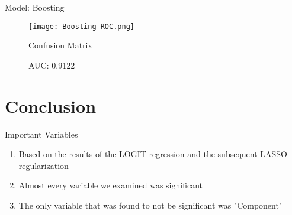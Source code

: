 \documentclass[notes,compress,serif,professionalfont]{beamer}
\begin{document}
\begin{frame}{Model: Boosting}
    \begin{figure}
        \centering
        \begin{minipage}{.5\textwidth}
            \centering
            \texttt{[image: Boosting ROC.png]}
        \end{minipage}%
        \begin{minipage}{.5\textwidth}
            \caption*{Confusion Matrix}
            \begin{table}
            \centering
            \end{table}
        \end{minipage}
    \caption{AUC: 0.9122}
    \end{figure}
    
\end{frame}

\section{Conclusion}

\begin{frame}{Important Variables}
    \begin{enumerate}[<+->]
        \item Based on the results of the LOGIT regression and the subsequent LASSO regularization
        \item Almost every variable we examined was significant
        \item The only variable that was found to not be significant was "Component"
    \end{enumerate}
\end{frame}
\end{document}
